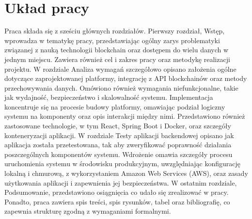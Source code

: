 \section{Układ pracy}
Praca składa się z sześciu głównych rozdziałów. Pierwszy rozdział, Wstęp, wprowadza w tematykę pracy, przedstawiając ogólny zarys problematyki związanej z nauką technologii blockchain oraz dostępem do wielu danych w jednym miejscu. Zawiera również cel i zakres pracy oraz metodykę realizacji projektu. W rozdziale Analiza wymagań szczegółowo opisano założenia ogólne dotyczące zaprojektowanej platformy, integrację z API blockchainów oraz metody przechowywania danych. Omówiono również wymagania niefunkcjonalne, takie jak wydajność, bezpieczeństwo i skalowalność systemu. Implementacja koncentruje się na procesie budowy platformy, omawiając podział logiczny systemu na komponenty oraz opis interakcji między nimi. Przedstawiono również zastosowane technologie, w tym React, Spring Boot i Docker, oraz szczegóły konteneryzacji aplikacji. W rozdziale Testy aplikacji backendowej opisano jak aplikacja została przetestowana, tak aby zweryfikować poprawność działania poszczególnych komponentów systemu. Wdrożenie omawia szczegóły procesu uruchomienia systemu w środowisku produkcyjnym, uwzględniając konfigurację lokalną i chmurową, z wykorzystaniem Amazon Web Services (AWS), oraz zasady użytkowania aplikacji i zapewnienia jej bezpieczeństwa. W ostatnim rozdziale, Podsumowanie, przedstawiono osiągnięcia co udało się zrealizować w pracy. Ponadto, praca zawiera spis treści, spis rysunków, tabel oraz bibliografię, co zapewnia strukturę zgodną z wymaganiami formalnymi.
